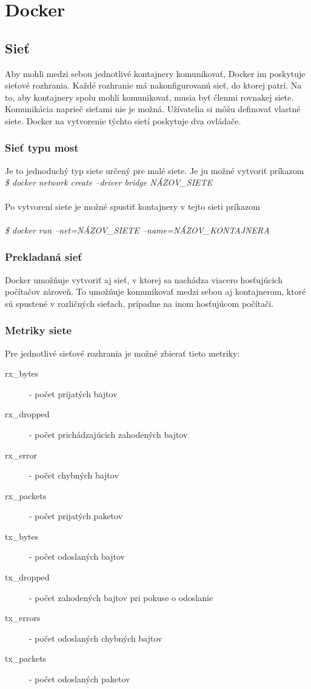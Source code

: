 \documentclass[11pt,final,oneside]{fithesis}
\begin{document}
\section{Docker}
\subsection{Sieť}
Aby mohli medzi sebou jednotlivé kontajnery komunikovať, Docker im poskytuje sieťové rozhrania. Každé rozhranie má nakonfigurovanú sieť,
do ktorej patrí. Na to, aby kontajnery spolu mohli komunikovať, musia byť členmi rovnakej siete. Komunikácia naprieč sieťami nie je možná.
Užívatelia si môžu definovať vlastné siete. Docker na vytvorenie týchto sietí poskytuje dva ovládače.

\subsubsection{Sieť typu most}
Je to jednoduchý typ siete určený pre malé siete. Je ju možné vytvoriť príkazom 
\\
{\em \$ docker network create --driver bridge NÁZOV\_SIETE}
\\ \\
Po vytvorení siete je možné spustiť kontajnery v tejto sieti príkazom
\\ \\
{\em \$ docker run --net=NÁZOV\_SIETE --name=NÁZOV\_KONTAJNERA}

\subsubsection{Prekladaná sieť}
Docker umožňuje vytvoriť aj sieť, v ktorej sa nachádza viacero hosťujúcich počítačov zároveň. To umožňuje komunikovať medzi sebou aj kontajnerom,
ktoré sú spustené v rozličných sieťach, prípadne na inom hosťujúcom počítači.


\subsubsection{Metriky siete}
Pre jednotlivé sieťové rozhrania je možné zbierať tieto metriky:
\begin{description}
\item[rx\_bytes] - počet prijatých bajtov
\item[rx\_dropped] - počet prichádzajúcich zahodených bajtov
\item[rx\_error] - počet chybných bajtov
\item[rx\_packets] - počet prijatých paketov
\item[tx\_bytes] - počet odoslaných bajtov
\item[tx\_dropped] - počet zahodených bajtov pri pokuse o odoslanie
\item[tx\_errors] - počet odoslaných chybných bajtov
\item[tx\_packets] - počet odoslaných paketov
\end{description}
\end{document}
